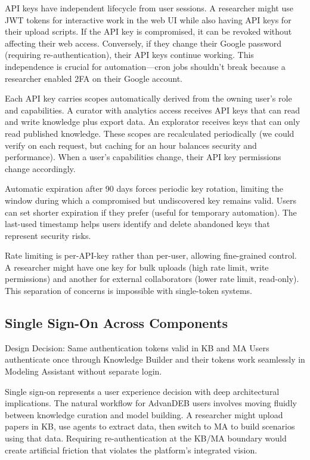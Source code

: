 \documentclass[12pt,a4paper]{article}
\begin{document}
API keys have independent lifecycle from user sessions. A researcher might use JWT tokens for interactive work in the web UI while also having API keys for their upload scripts. If the API key is compromised, it can be revoked without affecting their web access. Conversely, if they change their Google password (requiring re-authentication), their API keys continue working. This independence is crucial for automation—cron jobs shouldn't break because a researcher enabled 2FA on their Google account.

Each API key carries scopes automatically derived from the owning user's role and capabilities. A curator with analytics access receives API keys that can read and write knowledge plus export data. An explorator receives keys that can only read published knowledge. These scopes are recalculated periodically (we could verify on each request, but caching for an hour balances security and performance). When a user's capabilities change, their API key permissions change accordingly.

Automatic expiration after 90 days forces periodic key rotation, limiting the window during which a compromised but undiscovered key remains valid. Users can set shorter expiration if they prefer (useful for temporary automation). The last-used timestamp helps users identify and delete abandoned keys that represent security risks.

Rate limiting is per-API-key rather than per-user, allowing fine-grained control. A researcher might have one key for bulk uploads (high rate limit, write permissions) and another for external collaborators (lower rate limit, read-only). This separation of concerns is impossible with single-token systems.

\subsection{Single Sign-On Across Components}

\begin{rationale}{Design Decision: Same authentication tokens valid in KB and MA}
Users authenticate once through Knowledge Builder and their tokens work seamlessly in Modeling Assistant without separate login.
\end{rationale}

Single sign-on represents a user experience decision with deep architectural implications. The natural workflow for AdvanDEB users involves moving fluidly between knowledge curation and model building. A researcher might upload papers in KB, use agents to extract data, then switch to MA to build scenarios using that data. Requiring re-authentication at the KB/MA boundary would create artificial friction that violates the platform's integrated vision.
\end{document}
